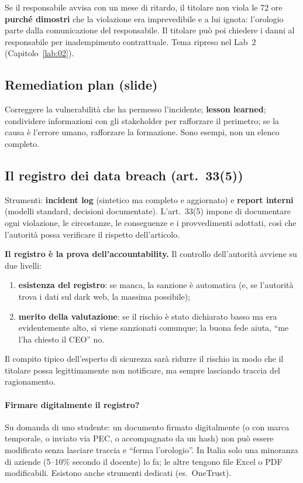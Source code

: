 \begin{esame}
Se il responsabile avvisa con un mese di ritardo, il titolare non viola le 72 ore
\textbf{purché dimostri} che la violazione era imprevedibile e a lui ignota: l'orologio parte dalla
comunicazione del responsabile. Il titolare può poi chiedere i danni al responsabile per
inadempimento contrattuale. Tema ripreso nel Lab~2 (Capitolo~\ref{lab:02}).
\end{esame}

\subsection{Remediation plan (slide)}
Correggere la vulnerabilità che ha permesso l'incidente; \textbf{lesson learned}; condividere
informazioni con gli stakeholder per rafforzare il perimetro; se la causa è l'errore umano, rafforzare
la formazione. Sono esempi, non un elenco completo.

\subsection{Il registro dei data breach (art.~33(5))}
Strumenti: \textbf{incident log} (sintetico ma completo e aggiornato) e \textbf{report interni}
(modelli standard, decisioni documentate). L'art.~33(5) impone di documentare ogni violazione, le
circostanze, le conseguenze e i provvedimenti adottati, così che l'autorità possa verificare il
rispetto dell'articolo.

\begin{esame}
\textbf{Il registro è la prova dell'accountability.} Il controllo dell'autorità avviene su due livelli:
\begin{enumerate}
  \item \textbf{esistenza del registro}: se manca, la sanzione è automatica (e, se l'autorità trova i
    dati sul dark web, la massima possibile);
  \item \textbf{merito della valutazione}: se il rischio è stato dichiarato basso ma era evidentemente
    alto, si viene sanzionati comunque; la buona fede aiuta, ``me l'ha chiesto il CEO'' no.
\end{enumerate}
Il compito tipico dell'esperto di sicurezza sarà ridurre il rischio in modo che il titolare possa
legittimamente non notificare, ma sempre lasciando traccia del ragionamento.
\end{esame}

\paragraph{Firmare digitalmente il registro?} Su domanda di uno studente: un documento firmato
digitalmente (o con marca temporale, o inviato via PEC, o accompagnato da un hash) non può essere
modificato senza lasciare traccia e ``ferma l'orologio''. In Italia solo una minoranza di aziende
(5--10\% secondo il docente) lo fa; le altre tengono file Excel o PDF modificabili. Esistono anche
strumenti dedicati (es.\ OneTrust).

